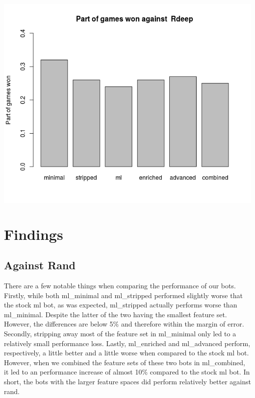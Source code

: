 \documentclass[a4paper,11pt]{article}
\begin{document}
\begin{center}
\begin{minipage}{0.49\linewidth}
\end{minipage}
      \\ %
\begin{minipage}{0.49\linewidth}
\includegraphics[width=\linewidth]{images/barplotRdeep.png}
\end{minipage}
\end{center}
\clearpage
\section{Findings}

\subsection*{Against Rand}
There are a few notable things when comparing the performance of our bots. Firstly, while both ml\_minimal and ml\_stripped performed slightly worse that the stock ml bot, as was expected, ml\_stripped actually performs worse than ml\_minimal. Despite the latter of the two having the smallest feature set. However, the differences are below 5\% and therefore within the margin of error. Secondly, stripping away most of the feature set in ml\_minimal only led to a relatively small performance loss. Lastly, ml\_enriched and ml\_advanced perform, respectively, a little better and a little worse when compared to the stock ml bot. However, when we combined the feature sets of these two bots in ml\_combined, it led to an performance increase of almost 10\% compared to the stock ml bot. In short, the bots with the larger feature spaces did perform relatively better against rand.
\end{document}
